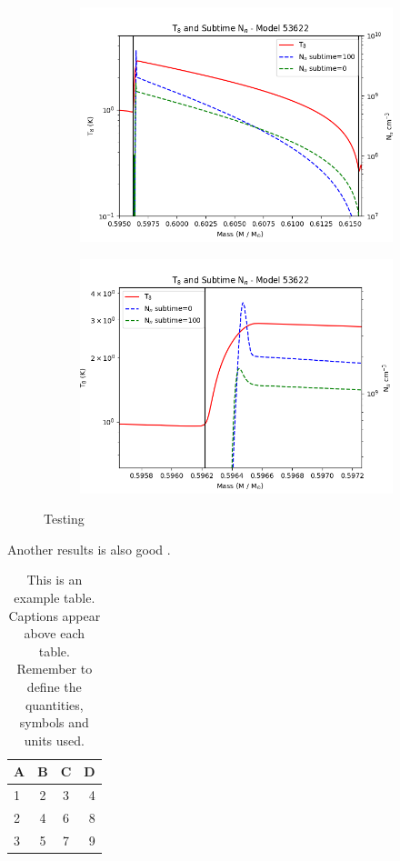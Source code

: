 \documentclass[fleqn,usenatbib]{mnras}
\begin{document}
\begin{figure}
\centering
\begin{subfigure}[b]{1\columnwidth}
   \includegraphics[width=1\columnwidth]{figs/T_Neutron_sub.png}
\end{subfigure}

\begin{subfigure}[b]{1\columnwidth}
   \includegraphics[width=1\columnwidth]{figs/T_Neutron_Sub_Closeup}
\end{subfigure}
\caption{Testing}
\end{figure}

Another results is also good .
\begin{table}
	\centering
	\caption{This is an example table. Captions appear above each table.
	Remember to define the quantities, symbols and units used.}
	\begin{tabular}{lccr} %
		\hline
		A & B & C & D\\
		\hline
		1 & 2 & 3 & 4\\
		2 & 4 & 6 & 8\\
		3 & 5 & 7 & 9\\
		\hline
	\end{tabular}
\end{table}
\end{document}
